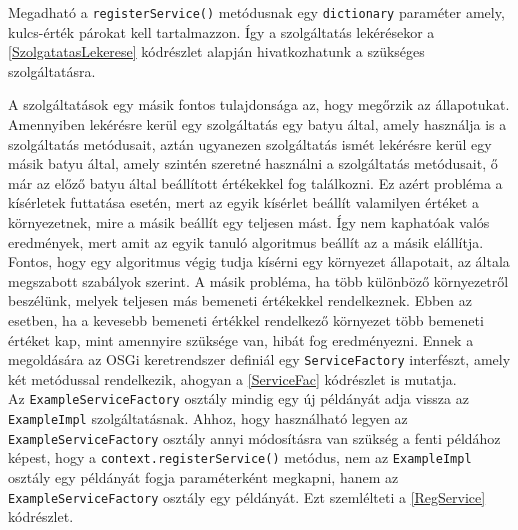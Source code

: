 %


Megadható a \texttt{registerService()} metódusnak egy \texttt{dictionary} paraméter amely, kulcs-érték párokat kell tartalmazzon. Így a szolgáltatás lekérésekor a \ref{SzolgatatasLekerese} kódrészlet alapján hivatkozhatunk a szükséges szolgáltatásra.

%



A szolgáltatások egy másik fontos tulajdonsága az, hogy megőrzik az állapotukat. Amennyiben lekérésre kerül egy szolgáltatás egy batyu által, amely használja is a szolgáltatás metódusait, aztán ugyanezen szolgáltatás ismét lekérésre kerül egy másik batyu által, amely szintén szeretné használni a szolgáltatás metódusait, ő már az előző batyu által beállított értékekkel fog találkozni. Ez azért probléma a kísérletek futtatása esetén, mert az egyik kísérlet beállít valamilyen értéket a környezetnek, mire a másik beállít egy teljesen mást. Így nem kaphatóak valós eredmények, mert amit az egyik tanuló algoritmus beállít az a másik elállítja. Fontos, hogy egy algoritmus végig tudja kísérni egy környezet állapotait, az általa megszabott szabályok szerint. A másik probléma, ha több különböző környezetről beszélünk, melyek teljesen más bemeneti értékekkel rendelkeznek. Ebben az esetben, ha a kevesebb bemeneti értékkel rendelkező környezet több bemeneti értéket kap, mint amennyire szüksége van, hibát fog eredményezni. Ennek a megoldására az OSGi keretrendszer definiál egy \texttt{ServiceFactory} interfészt, amely két metódussal rendelkezik, ahogyan a \ref{ServiceFac} kódrészlet is mutatja.
\\
%


Az \texttt{ExampleServiceFactory} osztály mindig egy új példányát adja vissza az \texttt{ExampleImpl} szolgáltatásnak. Ahhoz, hogy használható legyen az \texttt{ExampleServiceFactory} osztály annyi módosításra van szükség a fenti példához képest, hogy a \texttt{context.registerService()} metódus, nem az \texttt{ExampleImpl} osztály egy példányát fogja paraméterként megkapni, hanem az \texttt{ExampleServiceFactory} osztály egy példányát. Ezt szemlélteti a \ref{RegService} kódrészlet.

